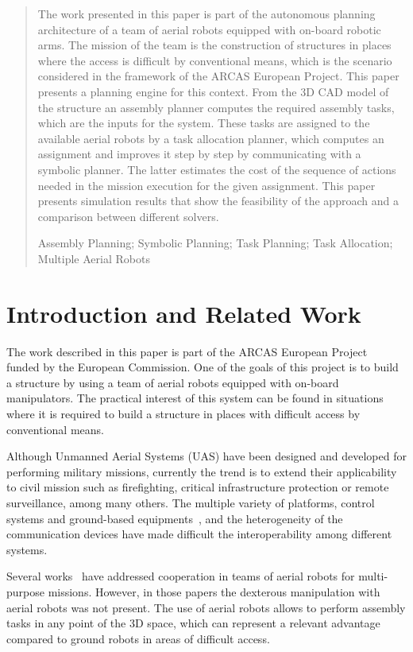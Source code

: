 \documentclass[runningheads,a4paper]{llncs}
\newcommand{\keywords}[1]{\par\addvspace\baselineskip
\noindent\keywordname\enspace\ignorespaces#1}
\begin{document}
\begin{abstract}
The work presented in this paper is part of the autonomous planning architecture of a team of aerial robots equipped with on-board robotic arms. The mission of the team is the construction of structures in places where the access is difficult by conventional means, which is the scenario considered in the framework of the ARCAS European Project. This paper presents a planning engine for this context. From the 3D CAD model of the structure an assembly planner computes the required assembly tasks, which are the inputs for the system. These tasks are assigned to the available aerial robots by a task allocation planner, which computes an assignment and improves it step by step by communicating with a symbolic planner. The latter estimates the cost of the sequence of actions needed in the mission execution for the given assignment. This paper presents simulation results that show the feasibility of the approach and a comparison between different solvers.
\keywords{Assembly Planning; Symbolic Planning; Task Planning; Task Allocation; Multiple Aerial Robots}
\end{abstract}

\section{Introduction and Related Work}
\label{sec:intro}

The work described in this paper is part of the ARCAS European Project~\cite{kondak_ijars13} funded by the European Commission. One of the goals of this project is to build a structure by using a team of aerial robots equipped with on-board manipulators. The practical interest of this system can be found in situations where it is required to build a structure in places with difficult access by conventional means.

Although Unmanned Aerial Systems (UAS) have been designed and developed for performing military missions, currently the trend is to extend their applicability to civil mission such as firefighting, critical infrastructure protection or remote surveillance, among many others.  The multiple variety of platforms, control systems and ground-based equipments~\cite{perez_jint13,maza_jint10_multimodal}, and the heterogeneity of the communication devices have made difficult the interoperability among different systems. 

Several works~\cite{maza_icuas14,maza_jfr11_multiuav} have addressed cooperation in teams of aerial robots for multi-purpose missions. However, in those papers the dexterous manipulation with aerial robots was not present. The use of aerial robots allows to perform assembly tasks in any point of the 3D space, which can represent a relevant advantage compared to ground robots in areas of difficult access.
\end{document}
